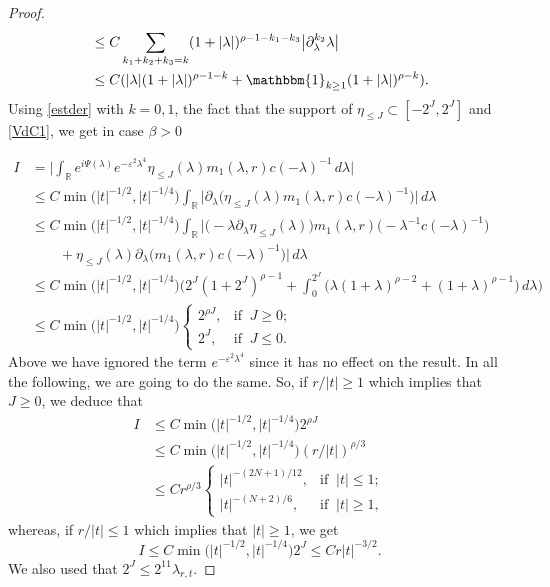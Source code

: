 \documentclass[10pt,leqno]{amsart}
\numberwithin{equation}{section}
\newcommand{\field}[1]{\mathbb{#1}}
\newcommand{\R}{\field{R}}          		%
\newcommand{\one}{\mathbbm{1}}
\begin{document}
\begin{proof}
\begin{align}
&\leq C \sum_{k_1+k_2+k_3=k} (1+|\lambda|)^{\rho -1 - k_1 - k_3} \big|\partial_{\lambda}^{k_2}\lambda\big|\nonumber\\
&\leq C (|\lambda| (1+|\lambda|)^{\rho -1 - k}+\one_{k\geq 1} (1+|\lambda|)^{\rho -k} ).
\end{align}
Using \eqref{estder} with $k=0,1$, the fact that the support of $\eta_{\leq J} \subset [-2^J,2^J]$ and \eqref{VdC1}, we get in case $\beta>0$

\begin{align*}
I&=\Big|\int_\R e^{i\Psi(\lambda)}e^{-\varepsilon^2 \lambda^4} \eta_{\leq J}(\lambda) m_1 (\lambda ,r) c(-\lambda )^{-1}\, d\lambda\Big|\\
&\leq C \min \big(|t|^{-1/2},|t|^{-1/4}\big) \int_{\R} 
\big|\partial_\lambda \big(\eta_{\leq J}(\lambda) m_1 (\lambda ,r) c(-\lambda)^{-1}\big)\big|\, d\lambda  \\
&\leq C  \min \big(|t|^{-1/2},|t|^{-1/4}\big) \int_{\R} \big|\big(-\lambda\partial_\lambda \eta_{\leq J}(\lambda)\big) m_1 (\lambda ,r)\big(-\lambda^{-1} c(-\lambda)^{-1}\big)
\\
&\qquad + \eta_{\leq J}(\lambda) \partial_\lambda \big(m_1 (\lambda ,r) c(-\lambda)^{-1}\big)
\big|\, d\lambda\\
&\leq C \min \big(|t|^{-1/2},|t|^{-1/4}\big)\Big(  2^J (1+2^J)^{\rho -1} + \int_0^{2^J} \big(\lambda (1+ \lambda)^{\rho -2}+ (1+\lambda)^{\rho -1} \big)\,d\lambda\Big)\\
&\leq C  \min \big(|t|^{-1/2},|t|^{-1/4}\big) 
\begin{cases} 
2^{\rho J},&\mbox{if }\ J\geq 0;\\ 
2^J ,&\mbox{if }\ J\leq 0 . 
\end{cases}
\end{align*}
 Above we have ignored the term $e^{-\varepsilon^2\lambda^4}$ since it has no effect on the result. In all the following, we are going to do the same.
So, if $r/|t| \geq 1$ which implies that $J\geq 0$, we deduce that
\begin{align}
\label{1412e1}
I &\leq C \min \big(|t|^{-1/2},|t|^{-1/4}\big) 2^{\rho J}\nonumber \\
&\leq C\min \big(|t|^{-1/2},|t|^{-1/4}\big)  (r/|t|)^{\rho /3} \nonumber\\
&\leq Cr^{\rho /3}
\begin{cases} 
|t|^{-(2N+1)/12},&\mbox{if }\ |t|\leq 1;\\  
|t|^{-(N+2)/6},&\mbox{if }\ |t|\geq 1 ,
\end{cases}
\end{align} 
whereas, if $r/|t|\leq 1$ which implies that $|t|\geq 1$, we get
\begin{equation}
\label{1412e2}
I\leq C\min \big(|t|^{-1/2},|t|^{-1/4}\big) 2^{ J} 
\leq C r|t|^{-3/2}.
\end{equation}
We also used that $2^J \leq 2^{11}\lambda_{r,t}$.



\end{proof}
\end{document}
